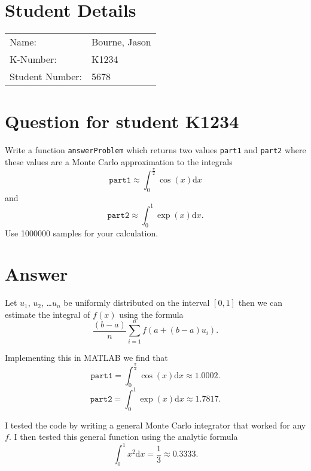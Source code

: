\documentclass{article}
\newcommand{\ed}{\mathrm{d}}
\begin{document}
\section{Student Details}
\begin{tabular}{ll}
Name: & Bourne, Jason\\ 
K-Number: & K1234\\ 
Student Number: & 5678\\ 
\end{tabular}
\section{Question for student K1234}

Write a function \verb=answerProblem= which returns two values \verb=part1= and
\verb=part2= where these values are a Monte Carlo approximation to the integrals
\[
\mathtt{part1} \approx \int_0^\frac{\pi}{2} \cos(x) \ed x
\]
and
\[
\mathtt{part2} \approx \int_0^1 \exp(x) \ed x.
\]
Use 1000000 samples for your calculation.

\section{Answer}

Let $u_1$, $u_2$, \ldots $u_n$ be uniformly distributed on the interval
$[0,1]$ then we can estimate the integral of $f(x)$ using the formula
\[
\frac{(b-a)}{n} \sum_{i=1}^n f( a + (b-a)u_i ).
\]

Implementing this in MATLAB we find that
\[
\mathtt{part1} = \int_0^\frac{\pi}{2} \cos(x) \ed x \approx 1.0002.
\]
\[
\mathtt{part2} = \int_0^1 \exp(x) \ed x \approx 1.7817.
\]

I tested the code by writing a general Monte Carlo integrator that worked
for any $f$. I then tested this general function using the analytic formula
\[
\int_0^1 x^2 \ed x = \frac{1}{3} \approx 0.3333.
\]
\end{document}
